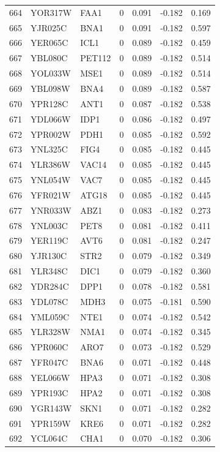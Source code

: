 \begin{longtable}{rllrrrr}
664 & YOR317W & FAA1 & 0 & 0.091 & -0.182 & 0.169\\
665 & YJR025C & BNA1 & 0 & 0.091 & -0.182 & 0.597\\
666 & YER065C & ICL1 & 0 & 0.089 & -0.182 & 0.459\\
667 & YBL080C & PET112 & 0 & 0.089 & -0.182 & 0.514\\
668 & YOL033W & MSE1 & 0 & 0.089 & -0.182 & 0.514\\
669 & YBL098W & BNA4 & 0 & 0.089 & -0.182 & 0.587\\
670 & YPR128C & ANT1 & 0 & 0.087 & -0.182 & 0.538\\
671 & YDL066W & IDP1 & 0 & 0.086 & -0.182 & 0.497\\
672 & YPR002W & PDH1 & 0 & 0.085 & -0.182 & 0.592\\
673 & YNL325C & FIG4 & 0 & 0.085 & -0.182 & 0.445\\
674 & YLR386W & VAC14 & 0 & 0.085 & -0.182 & 0.445\\
675 & YNL054W & VAC7 & 0 & 0.085 & -0.182 & 0.445\\
676 & YFR021W & ATG18 & 0 & 0.085 & -0.182 & 0.445\\
677 & YNR033W & ABZ1 & 0 & 0.083 & -0.182 & 0.273\\
678 & YNL003C & PET8 & 0 & 0.081 & -0.182 & 0.411\\
679 & YER119C & AVT6 & 0 & 0.081 & -0.182 & 0.247\\
680 & YJR130C & STR2 & 0 & 0.079 & -0.182 & 0.349\\
681 & YLR348C & DIC1 & 0 & 0.079 & -0.182 & 0.360\\
682 & YDR284C & DPP1 & 0 & 0.078 & -0.182 & 0.581\\
683 & YDL078C & MDH3 & 0 & 0.075 & -0.181 & 0.590\\
684 & YML059C & NTE1 & 0 & 0.074 & -0.182 & 0.542\\
685 & YLR328W & NMA1 & 0 & 0.074 & -0.182 & 0.345\\
686 & YPR060C & ARO7 & 0 & 0.073 & -0.182 & 0.529\\
687 & YFR047C & BNA6 & 0 & 0.071 & -0.182 & 0.448\\
688 & YEL066W & HPA3 & 0 & 0.071 & -0.182 & 0.308\\
689 & YPR193C & HPA2 & 0 & 0.071 & -0.182 & 0.308\\
690 & YGR143W & SKN1 & 0 & 0.071 & -0.182 & 0.282\\
691 & YPR159W & KRE6 & 0 & 0.071 & -0.182 & 0.282\\
692 & YCL064C & CHA1 & 0 & 0.070 & -0.182 & 0.306\\

\end{longtable}
